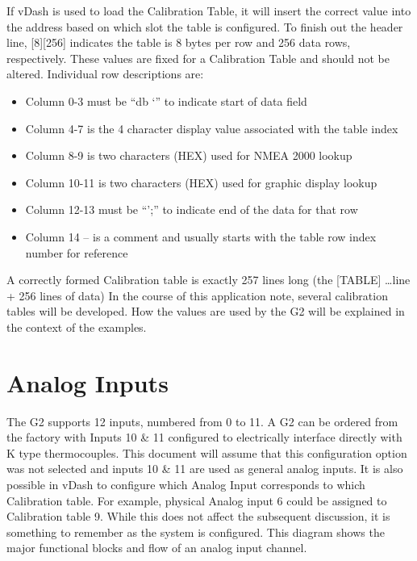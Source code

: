 \documentclass[12pt, letterpaper, twoside, titlepage]{article}
\begin{document}

If vDash is used to load the Calibration Table, it will insert the correct value into the address based on which slot the table is configured. To finish out the header line, [8][256] indicates the table is 8 bytes per row and 256 data rows, respectively.  These values are fixed for a Calibration Table and should not be altered. Individual row descriptions are:

\begin{itemize}
\item Column 0-3 must be “db ‘” to indicate start of data field
\item Column 4-7 is the 4 character display value associated with the table index
\item Column 8-9 is two characters (HEX) used for NMEA 2000 lookup
\item Column 10-11 is two characters (HEX) used for graphic display lookup
\item Column 12-13 must be “’;” to indicate end of the data for that row
\item Column 14 – is a comment and usually starts with the table row index number for reference
\end{itemize}

\par
A correctly formed Calibration table is exactly 257 lines long (the [TABLE] \dots line + 256 lines of data)  In the course of this application note, several calibration tables will be developed. How the values are used by the G2 will be explained in the context of the examples. 

\section{Analog Inputs}
The G2 supports 12 inputs, numbered from 0 to 11.  A G2 can be ordered from the factory with Inputs 10 \& 11 configured  to electrically interface directly with K type thermocouples.   This document will assume that this configuration option was not selected and inputs 10 \& 11 are used as general analog inputs. It is also possible in vDash to configure which Analog Input corresponds to which Calibration table.  For example, physical Analog input 6 could be assigned to Calibration table 9.  While this does not affect the subsequent discussion, it is something to remember as the system is configured.  This diagram shows the major functional blocks and flow of an analog input channel.
\end{document}
